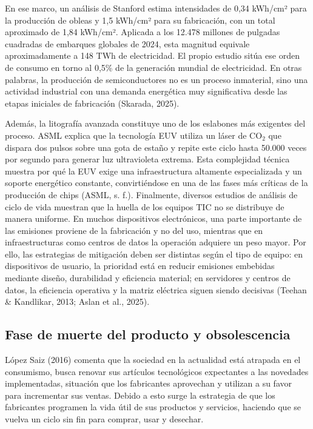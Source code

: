 \documentclass[stu,12pt,a4paper]{apa7}
\begin{document}
En ese marco, un análisis de Stanford estima intensidades de 0,34 kWh/cm² para la producción de obleas y 1,5 kWh/cm² para su fabricación, con un total aproximado de 1,84 kWh/cm². Aplicada a los 12.478 millones de pulgadas cuadradas de embarques globales de 2024, esta magnitud equivale aproximadamente a 148 TWh de electricidad. El propio estudio sitúa ese orden de consumo en torno al 0,5\% de la generación mundial de electricidad. En otras palabras, la producción de semiconductores no es un proceso inmaterial, sino una actividad industrial con una demanda energética muy significativa desde las etapas iniciales de fabricación (Skarada, 2025).

Además, la litografía avanzada constituye uno de los eslabones más exigentes del proceso. ASML explica que la tecnología EUV utiliza un láser de CO$_2$ que dispara dos pulsos sobre una gota de estaño y repite este ciclo hasta 50.000 veces por segundo para generar luz ultravioleta extrema. Esta complejidad técnica muestra por qué la EUV exige una infraestructura altamente especializada y un soporte energético constante, convirtiéndose en una de las fases más críticas de la producción de chips (ASML, s. f.).
Finalmente, diversos estudios de análisis de ciclo de vida muestran que la huella de los equipos TIC no se distribuye de manera uniforme. En muchos dispositivos electrónicos, una parte importante de las emisiones proviene de la fabricación y no del uso, mientras que en infraestructuras como centros de datos la operación adquiere un peso mayor. Por ello, las estrategias de mitigación deben ser distintas según el tipo de equipo: en dispositivos de usuario, la prioridad está en reducir emisiones embebidas mediante diseño, durabilidad y eficiencia material; en servidores y centros de datos, la eficiencia operativa y la matriz eléctrica siguen siendo decisivas (Teehan \& Kandlikar, 2013; Aslan et al., 2025).

    \subsection{Fase de muerte del producto y obsolescencia}
López Saiz (2016) comenta que la sociedad en la actualidad está atrapada en el consumismo, busca renovar sus artículos tecnológicos expectantes a las novedades implementadas, situación que los fabricantes aprovechan y utilizan a su favor para incrementar sus ventas.
Debido a esto surge la estrategia de que los fabricantes programen la vida útil de sus productos y servicios, haciendo que se vuelva un ciclo sin fin para comprar, usar y desechar.
\end{document}
